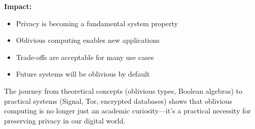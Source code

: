 \documentclass[11pt,final,hidelinks]{article}
\begin{document}
\textbf{Impact:}
\begin{itemize}
    \item Privacy is becoming a fundamental system property
    \item Oblivious computing enables new applications
    \item Trade-offs are acceptable for many use cases
    \item Future systems will be oblivious by default
\end{itemize}

The journey from theoretical concepts (oblivious types, Boolean algebras) to practical systems (Signal, Tor, encrypted databases) shows that oblivious computing is no longer just an academic curiosity—it's a practical necessity for preserving privacy in our digital world.


\end{document}
